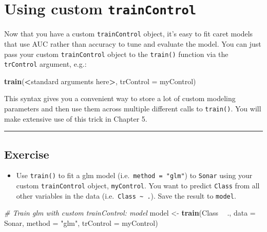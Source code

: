 \documentclass[
]{book}
\newenvironment{Shaded}{\begin{snugshade}}{\end{snugshade}}
\newcommand{\CommentTok}[1]{\textcolor[rgb]{0.56,0.35,0.01}{\textit{#1}}}
\newcommand{\DataTypeTok}[1]{\textcolor[rgb]{0.13,0.29,0.53}{#1}}
\newcommand{\KeywordTok}[1]{\textcolor[rgb]{0.13,0.29,0.53}{\textbf{#1}}}
\newcommand{\NormalTok}[1]{#1}
\newcommand{\OperatorTok}[1]{\textcolor[rgb]{0.81,0.36,0.00}{\textbf{#1}}}
\newcommand{\StringTok}[1]{\textcolor[rgb]{0.31,0.60,0.02}{#1}}
\providecommand{\tightlist}{%
  \setlength{\itemsep}{0pt}\setlength{\parskip}{0pt}}
\begin{document}
\hypertarget{using-custom-traincontrol}{%
\section{\texorpdfstring{Using custom \texttt{trainControl}}{Using custom trainControl}}\label{using-custom-traincontrol}}

Now that you have a custom \texttt{trainControl} object, it's easy to fit caret models that use AUC rather than accuracy to tune and evaluate the model. You can just pass your custom \texttt{trainControl} object to the \texttt{train()} function via the \texttt{trControl} argument, e.g.:

\begin{Shaded}
\begin{Highlighting}[]
\KeywordTok{train}\NormalTok{(}\OperatorTok{<}\NormalTok{standard arguments here}\OperatorTok{>}\NormalTok{, }\DataTypeTok{trControl =}\NormalTok{ myControl)}
\end{Highlighting}
\end{Shaded}

This syntax gives you a convenient way to store a lot of custom modeling parameters and then use them across multiple different calls to \texttt{train()}. You will make extensive use of this trick in Chapter 5.

\begin{center}\rule{0.5\linewidth}{0.5pt}\end{center}

\hypertarget{exercise-16}{%
\subsection*{Exercise}\label{exercise-16}}

\begin{itemize}
\tightlist
\item
  Use \texttt{train()} to fit a glm model (i.e.~\texttt{method\ =\ "glm"}) to \texttt{Sonar} using your custom \texttt{trainControl} object, \texttt{myControl}. You want to predict \texttt{Class} from all other variables in the data (i.e.~\texttt{Class\ \textasciitilde{}\ .}). Save the result to \texttt{model}.
\end{itemize}

\begin{Shaded}
\begin{Highlighting}[]
\CommentTok{# Train glm with custom trainControl: model}
\NormalTok{model <-}\StringTok{ }\KeywordTok{train}\NormalTok{(Class }\OperatorTok{~}\StringTok{ }\NormalTok{., }\DataTypeTok{data =}\NormalTok{ Sonar, }
               \DataTypeTok{method =} \StringTok{"glm"}\NormalTok{, }
               \DataTypeTok{trControl =}\NormalTok{ myControl)}
\end{Highlighting}
\end{Shaded}
\end{document}
